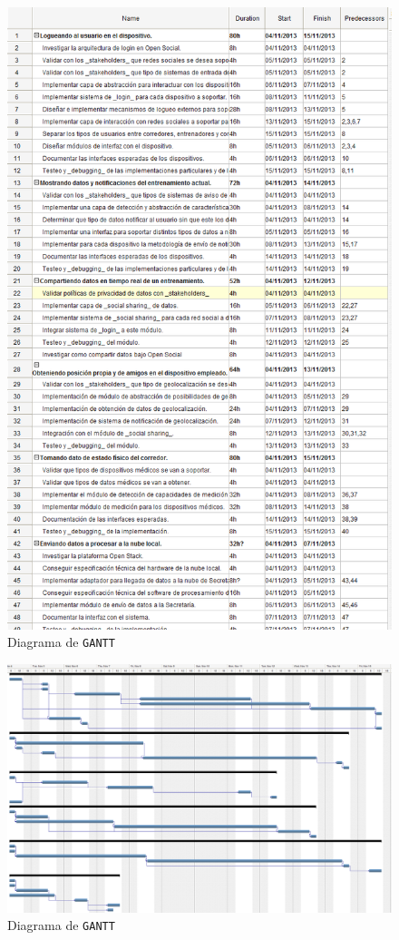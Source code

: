 \begin{figure}[c]
  \label{diag_diseno}
  \includegraphics[scale=0.75]{images/GANTTABLE.png}
  \caption{Diagrama de \texttt{GANTT}}
\end{figure} 

\begin{landscape}
\begin{figure}[c]
  \label{diag_diseno}
  \includegraphics[scale=0.5]{images/GANTGRAPH.png}
  \caption{Diagrama de \texttt{GANTT}}
\end{figure} 
\end{landscape}
